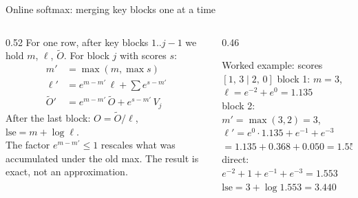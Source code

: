 \documentclass[aspectratio=169,11pt]{beamer}
\begin{document}
\begin{frame}{Online softmax: merging key blocks one at a time}
\begin{columns}[T]
\begin{column}{0.52\textwidth}
For one row, after key blocks $1..j-1$ we hold $m$, $\ell$, $\tilde O$. For block $j$ with scores $s$:
\begin{align*}
m' &= \max(m, \max s)\\
\ell' &= e^{m-m'}\,\ell + \textstyle\sum e^{s-m'}\\
\tilde O' &= e^{m-m'}\,\tilde O + e^{s-m'}\,V_j
\end{align*}
After the last block: $O=\tilde O/\ell$, $\mathrm{lse}=m+\log\ell$.\\[2mm]
\small The factor $e^{m-m'}\le1$ rescales what was accumulated under the old max. The result is exact, not an approximation.
\end{column}
\begin{column}{0.46\textwidth}
\begin{block}{Worked example: scores $[1,\,3 \mid 2,\,0]$}\small
block 1: $m=3$, $\ell = e^{-2}+e^{0} = 1.135$\\[1mm]
block 2: $m'=\max(3,2)=3$,\\
\quad $\ell' = e^{0}\cdot1.135 + e^{-1}+e^{-3}$\\
\quad\phantom{$\ell'$} $= 1.135+0.368+0.050 = 1.553$\\[1mm]
direct: $e^{-2}+1+e^{-1}+e^{-3}=1.553$ \checkmark\\[1mm]
$\mathrm{lse} = 3+\log 1.553 = 3.440$
\end{block}
\end{column}
\end{columns}
\end{frame}
\end{document}
